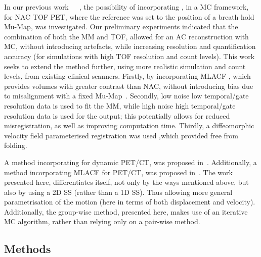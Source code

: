            In our previous work~\parencite{Whitehead2019ImpactPET}~\parencite{Whitehead2020PET/CTFields}~\parencite{Whitehead2021ComparisonMap}, the possibility of incorporating , in a \gls{MC} framework, for \gls{NAC} \gls{TOF} \gls{PET}, where the reference was set to the position of a breath hold \gls{Mu-Map}, was investigated. %
            Our preliminary experiments indicated that the combination of both the \gls{MM} and \gls{TOF}, allowed for an \gls{AC} reconstruction with \gls{MC}, without introducing artefacts, while increasing resolution and quantification accuracy (for simulations with high \gls{TOF} resolution and count levels). This work seeks to extend the method further, using more realistic simulation and count levels, from existing clinical scanners. Firstly, by incorporating \gls{MLACF} %
            , which provides volumes with greater contrast than \gls{NAC}, without introducing bias due to misalignment with a fixed \gls{Mu-Map}~\parencite{Nuyts2012ML-reconstructionFactors}. Secondly, low noise low temporal/gate resolution data is used to fit the \gls{MM}, while high noise high temporal/gate resolution data is used for the output; this potentially allows for reduced misregistration, as well as improving computation time. Thirdly, a diffeomorphic velocity field parameterised registration was used ,which provided  free from folding.
            
            A method incorporating  for dynamic \gls{PET}/\gls{CT}, was proposed in~\parencite{Chan2018Non-RigidPET}. Additionally, a method incorporating \gls{MLACF} for \gls{PET}/\gls{CT}, was proposed in~\parencite{Lu2018RespiratoryData}. The work presented here, differentiates itself, not only by the ways mentioned above, but also by using a \gls{2D} \gls{SS} (rather than a \gls{1D} \gls{SS}). Thus allowing more general parametrisation of the motion (here in terms of both displacement and velocity). Additionally, the group-wise method, presented here, makes use of an iterative \gls{MC} algorithm, rather than relying only on a pair-wise method.
        
        
        \subsection{Methods} \label{sec:pet_ct_motion_correction_exploiting_motion_models_fit_on_coarsely_gated_data_applied_to_finely_gated_data_methods}
